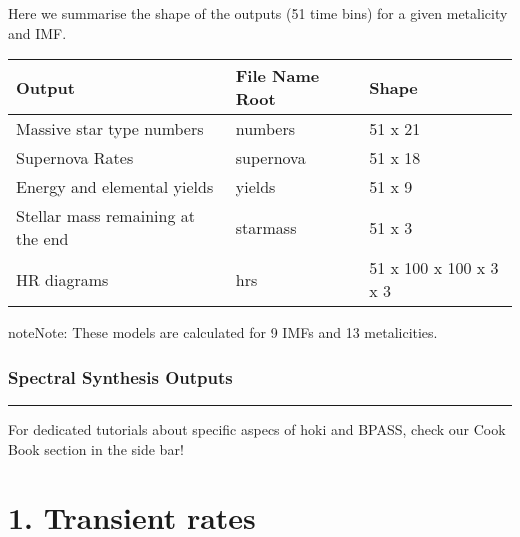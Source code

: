 \documentclass[letterpaper,10pt,english]{sphinxmanual}
\begin{document}
Here we summarise the shape of the outputs (51 time bins) for a given metalicity and IMF.


\begin{savenotes}\sphinxattablestart
\centering
\begin{tabulary}{\linewidth}[t]{|T|T|T|}
\hline
\sphinxstyletheadfamily 
Output
&\sphinxstyletheadfamily 
File Name Root
&\sphinxstyletheadfamily 
Shape
\\
\hline
Massive star type numbers
&
numbers
&
51 x 21
\\
\hline
Supernova Rates
&
supernova
&
51 x 18
\\
\hline
Energy and elemental yields
&
yields
&
51 x 9
\\
\hline
Stellar mass remaining at the end
&
starmass
&
51 x 3
\\
\hline
HR diagrams
&
hrs
&
51 x 100 x 100 x 3 x 3
\\
\hline
\end{tabulary}
\par
\sphinxattableend\end{savenotes}

\begin{sphinxadmonition}{note}{Note:}
These models are calculated for 9 IMFs and 13 metalicities.
\end{sphinxadmonition}


\subsection{Spectral Synthesis Outputs}
\label{\detokenize{quick_start:spectral-synthesis-outputs}}

\bigskip\hrule\bigskip





For dedicated tutorials about specific aspecs of hoki and BPASS, check our Cook Book section in the side bar!




\chapter{1. Transient rates}
\label{\detokenize{Transient_rates::doc}}\label{\detokenize{Transient_rates:1.-Transient-rates}}
\end{document}
